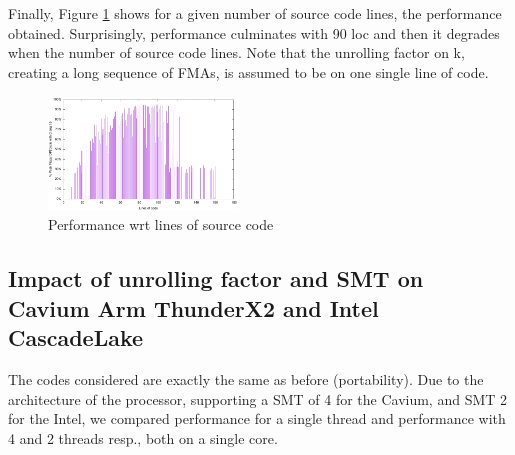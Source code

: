 \documentclass{article}
\begin{document}
Finally, Figure \ref{fig:cascadelakeloc} shows for a given number of
source code lines, the performance obtained. Surprisingly, performance
culminates with 90 loc and then it degrades when the number of source
code lines. Note that the unrolling factor on k, creating a long
sequence of FMAs, is assumed to be on one single line of code.
\begin{figure}[h!]
  \includegraphics[width=0.45\textwidth]{../benches/gemm/cascadelake-64x256x64/icc21loc.pdf}
  \caption{Performance wrt lines of source code\label{fig:cascadelakeloc}}
\end{figure}


\subsection{Impact of unrolling factor and SMT on Cavium Arm ThunderX2 and Intel CascadeLake}
The codes considered are exactly the same as before (portability).  Due to the architecture of the processor, supporting a SMT of 4 for the Cavium, and SMT 2 for the Intel, we compared performance for a single thread and performance with 4 and 2  threads resp., both on a single core. 
\end{document}
